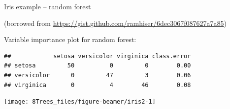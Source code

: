 \documentclass[10pt,ignorenonframetext,]{beamer}
\newenvironment{Shaded}{\begin{snugshade}}{\end{snugshade}}
\newcommand{\KeywordTok}[1]{\textcolor[rgb]{0.13,0.29,0.53}{\textbf{#1}}}
\newcommand{\DataTypeTok}[1]{\textcolor[rgb]{0.13,0.29,0.53}{#1}}
\newcommand{\DecValTok}[1]{\textcolor[rgb]{0.00,0.00,0.81}{#1}}
\newcommand{\StringTok}[1]{\textcolor[rgb]{0.31,0.60,0.02}{#1}}
\newcommand{\OperatorTok}[1]{\textcolor[rgb]{0.81,0.36,0.00}{\textbf{#1}}}
\newcommand{\NormalTok}[1]{#1}
\begin{document}
\begin{frame}[fragile]

\begin{block}{Iris example -- random forest}

\tiny
(borrowed from
\url{https://gist.github.com/ramhiser/6dec3067f087627a7a85})

\vspace{1mm}

\normalsize
Variable importance plot for random forest:

\scriptsize

\begin{Shaded}
\end{Shaded}

\begin{verbatim}
##            setosa versicolor virginica class.error
## setosa         50          0         0        0.00
## versicolor      0         47         3        0.06
## virginica       0          4        46        0.08
\end{verbatim}

\begin{center}\texttt{[image: 8Trees\_files/figure-beamer/iris2-1]} \end{center}

\end{block}

\end{frame}
\end{document}
